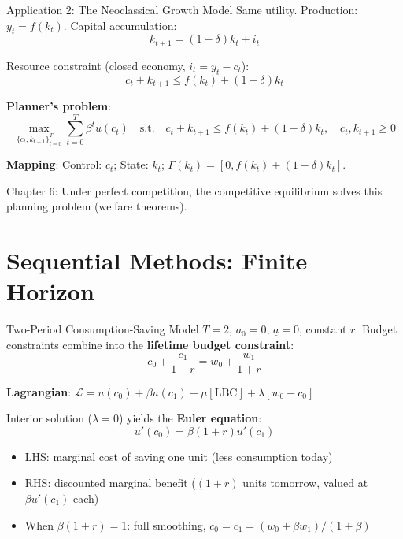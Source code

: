 \documentclass[blue]{beamer}
\begin{document}
\begin{frame}{Application 2: The Neoclassical Growth Model}
	Same utility. Production: $y_t = f(k_t)$. Capital accumulation:
	\[
	k_{t+1} = (1-\delta)k_t + i_t
	\]
	
	Resource constraint (closed economy, $i_t = y_t - c_t$):
	\[
	c_t + k_{t+1} \leq f(k_t) + (1-\delta)k_t
	\]
	
	\textbf{Planner's problem}:
	\[
	\max_{\{c_t, k_{t+1}\}_{t=0}^T} \sum_{t=0}^T \beta^t u(c_t) \quad \text{s.t.} \quad c_t + k_{t+1} \leq f(k_t) + (1-\delta)k_t, \quad c_t, k_{t+1} \geq 0
	\]
	
	\textbf{Mapping}: Control: $c_t$; State: $k_t$; $\Gamma(k_t) = [0, f(k_t) + (1-\delta)k_t]$.
	
	\bigskip
	Chapter 6: Under perfect competition, the competitive equilibrium solves this planning problem (welfare theorems).
\end{frame}


\section{Sequential Methods: Finite Horizon}

\begin{frame}{Two-Period Consumption-Saving Model}
	$T = 2$, $a_0 = 0$, $\underline{a} = 0$, constant $r$. Budget constraints combine into the \textbf{lifetime budget constraint}:
	\[
	c_0 + \frac{c_1}{1+r} = w_0 + \frac{w_1}{1+r}
	\]
	
	\textbf{Lagrangian}: $\mathcal{L} = u(c_0) + \beta u(c_1) + \mu[\text{LBC}] + \lambda[w_0 - c_0]$
	

	Interior solution ($\lambda = 0$) yields the \textbf{Euler equation}:
	\[
	u'(c_0) = \beta(1+r) u'(c_1)
	\]
	
	\begin{itemize}
		\item LHS: marginal cost of saving one unit (less consumption today)
		\item RHS: discounted marginal benefit ($(1+r)$ units tomorrow, valued at $\beta u'(c_1)$ each)
		\item When $\beta(1+r) = 1$: full smoothing, $c_0 = c_1 = (w_0 + \beta w_1)/(1+\beta)$
	\end{itemize}
\end{frame}
\end{document}
